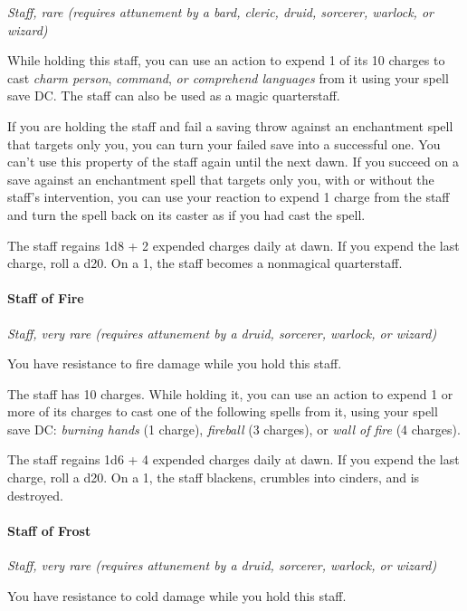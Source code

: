 \documentclass[
]{article}
\begin{document}
\emph{Staff, rare (requires attunement by a bard, cleric, druid,
sorcerer, warlock, or wizard)}

While holding this staff, you can use an action to expend 1 of its 10
charges to cast \emph{charm person}, \emph{command}, \emph{or comprehend
languages} from it using your spell save DC. The staff can also be used
as a magic quarterstaff.

If you are holding the staff and fail a saving throw against an
enchantment spell that targets only you, you can turn your failed save
into a successful one. You can't use this property of the staff again
until the next dawn. If you succeed on a save against an enchantment
spell that targets only you, with or without the staff's intervention,
you can use your reaction to expend 1 charge from the staff and turn the
spell back on its caster as if you had cast the spell.

The staff regains 1d8 + 2 expended charges daily at dawn. If you expend
the last charge, roll a d20. On a 1, the staff becomes a nonmagical
quarterstaff.

\hypertarget{staff-of-fire}{%
\paragraph{Staff of Fire}\label{staff-of-fire}}

\emph{Staff, very rare (requires attunement by a druid, sorcerer,
warlock, or wizard)}

You have resistance to fire damage while you hold this staff.

The staff has 10 charges. While holding it, you can use an action to
expend 1 or more of its charges to cast one of the following spells from
it, using your spell save DC: \emph{burning hands} (1 charge),
\emph{fireball} (3 charges), or \emph{wall of fire} (4 charges).

The staff regains 1d6 + 4 expended charges daily at dawn. If you expend
the last charge, roll a d20. On a 1, the staff blackens, crumbles into
cinders, and is destroyed.

\hypertarget{staff-of-frost}{%
\paragraph{Staff of Frost}\label{staff-of-frost}}

\emph{Staff, very rare (requires attunement by a druid, sorcerer,
warlock, or wizard)}

You have resistance to cold damage while you hold this staff.
\end{document}
